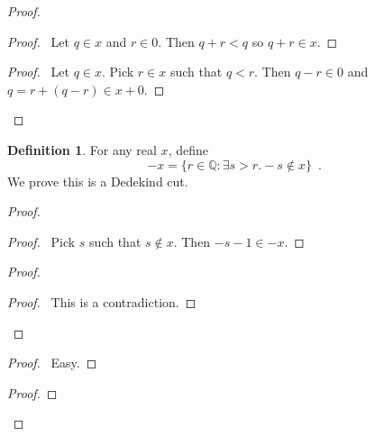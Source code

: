 \documentclass{article}
\let\qed\relax
\theoremstyle{definition}
\newtheorem{definition}[axiom]{Definition}
\begin{document}
    \begin{proof}
        \pf
        \begin{proof}
            \pf\ Let $q \in x$ and $r \in 0$. Then $q + r < q$ so $q + r \in x$.
        \end{proof}
        \begin{proof}
            \pf\ Let $q \in x$. Pick $r \in x$ such that $q < r$. Then $q - r \in 0$ and $q = r + (q-r) \in
            x + 0$.
        \end{proof}
        \qed
    \end{proof}

    \begin{definition}
        For any real $x$, define
        \[ - x = \{ r \in \mathbb{Q} : \exists s > r. -s \notin x \} \enspace . \]
        We prove this is a Dedekind cut.
    \end{definition}

    \begin{proof}
        \pf
        \begin{proof}
            \pf\ Pick $s$ such that $s \notin x$. Then $-s-1 \in -x$.
        \end{proof}
        \begin{proof}
            \qedstep
            \begin{proof}
                \pf\ This is a contradiction.
            \end{proof}
        \end{proof}
        \begin{proof}
            \pf\ Easy.
        \end{proof}
        \begin{proof}
        \end{proof}
        \qed
    \end{proof}
\end{document}
